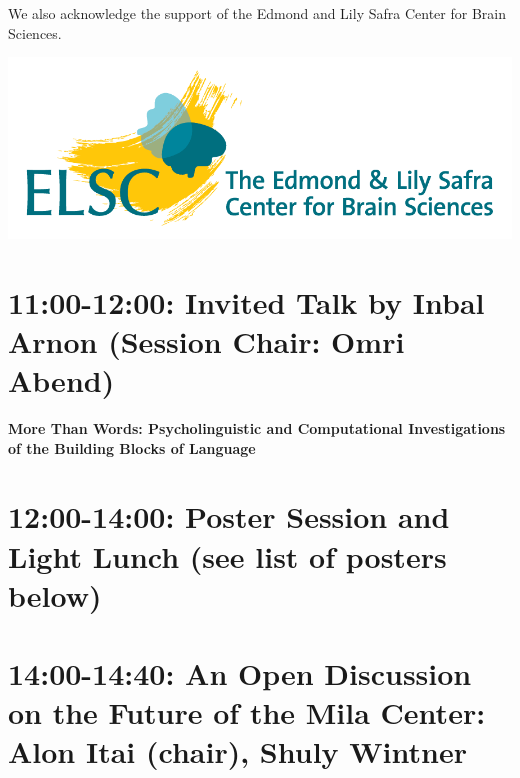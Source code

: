\documentclass[a0,portrait]{a0poster}
\newcommand{\forceindent}{\leavevmode{\parindent=1em\indent}}
\begin{document}
\begin{minipage}{.2\textwidth}
\begin{flushleft}
We also acknowledge the support of the Edmond and Lily Safra Center for Brain Sciences.
\end{flushleft}
\includegraphics[width=\textwidth]{elsc_logo.png}
\end{minipage}

\begin{minipage}{.95\textwidth}
\LARGE

\section*{11:00-12:00: Invited Talk by Inbal Arnon (Session Chair: Omri Abend)}
\forceindent\LARGE\textbf{More Than Words: Psycholinguistic and Computational Investigations of the Building
Blocks of Language}\\

\section*{12:00-14:00: Poster Session and Light Lunch (see list of posters below)}

\section*{14:00-14:40: An Open Discussion on the Future of the Mila Center:
Alon Itai (chair), Shuly Wintner}
\end{minipage}
\end{document}
